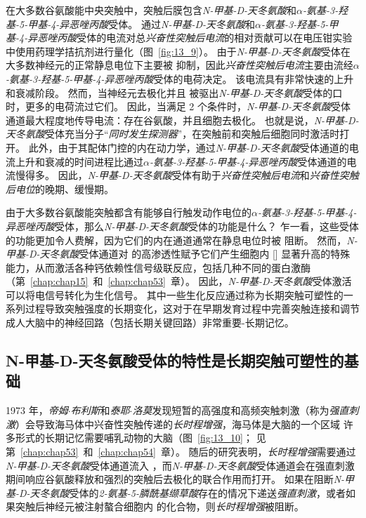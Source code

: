 在大多数谷氨酸能中央突触中，突触后膜包含\textit{N-甲基-D-天冬氨酸}和\textit{$\alpha$-氨基-3-羟基-5-甲基-4-异恶唑丙酸}受体。
通过\textit{N-甲基-D-天冬氨酸}和\textit{$\alpha$-氨基-3-羟基-5-甲基-4-异恶唑丙酸}受体的电流对总\textit{兴奋性突触后电流}的相对贡献可以在电压钳实验中使用药理学拮抗剂进行量化（图~\ref{fig:13_9}）。
由于\textit{N-甲基-D-天冬氨酸}受体在大多数神经元的正常静息电位下主要被  抑制，因此\textit{兴奋性突触后电流}主要由流经\textit{$\alpha$-氨基-3-羟基-5-甲基-4-异恶唑丙酸}受体的电荷决定。
该电流具有非常快速的上升和衰减阶段。
然而，当神经元去极化并且  被驱出\textit{N-甲基-D-天冬氨酸}受体的口时，更多的电荷流过它们。
因此，当满足 2 个条件时，\textit{N-甲基-D-天冬氨酸}受体通道最大程度地传导电流：存在谷氨酸，并且细胞去极化。
也就是说，\textit{N-甲基-D-天冬氨酸}受体充当分子“\textit{同时发生探测器}”，在突触前和突触后细胞同时激活时打开。
此外，由于其配体门控的内在动力学，通过\textit{N-甲基-D-天冬氨酸}受体通道的电流上升和衰减的时间进程比通过\textit{$\alpha$-氨基-3-羟基-5-甲基-4-异恶唑丙酸}受体通道的电流慢得多。
因此，\textit{N-甲基-D-天冬氨酸}受体有助于\textit{兴奋性突触后电流}和\textit{兴奋性突触后电位}的晚期、缓慢期。


由于大多数谷氨酸能突触都含有能够自行触发动作电位的\textit{$\alpha$-氨基-3-羟基-5-甲基-4-异恶唑丙酸}受体，那么\textit{N-甲基-D-天冬氨酸}受体的功能是什么？
乍一看，这些受体的功能更加令人费解，因为它们的内在通道通常在静息电位时被  阻断。
然而，\textit{N-甲基-D-天冬氨酸}受体通道对  的高渗透性赋予它们产生细胞内 [] 显著升高的特殊能力，从而激活各种钙依赖性信号级联反应，包括几种不同的蛋白激酶（第~\ref{chap:chap15}~和~\ref{chap:chap53}~章）。
因此，\textit{N-甲基-D-天冬氨酸}受体激活可以将电信号转化为生化信号。
其中一些生化反应通过称为长期突触可塑性的一系列过程导致突触强度的长期变化，这对于在早期发育过程中完善突触连接和调节成人大脑中的神经回路（包括长期关键回路）非常重要-长期记忆。



\subsection{N-甲基-D-天冬氨酸受体的特性是长期突触可塑性的基础}

1973 年，\textit{帝姆$\cdot$布利斯}和\textit{泰耶$\cdot$洛莫}发现短暂的高强度和高频突触刺激（称为\textit{强直刺激}）会导致海马体中兴奋性突触传递的\textit{长时程增强}，海马体是大脑的一个区域 许多形式的长期记忆需要哺乳动物的大脑（图~\ref{fig:13_10}；
见第~\ref{chap:chap53}~和~\ref{chap:chap54}~章）。
随后的研究表明，\textit{长时程增强}需要通过\textit{N-甲基-D-天冬氨酸}受体通道流入 ，而\textit{N-甲基-D-天冬氨酸}受体通道会在强直刺激期间响应谷氨酸释放和强烈的突触后去极化的联合作用而打开。
如果在阻断\textit{N-甲基-D-天冬氨酸}受体的\textit{2-氨基-5-膦酰基缬草酸}存在的情况下递送\textit{强直刺激}，或者如果突触后神经元被注射螯合细胞内  的化合物，则\textit{长时程增强}被阻断。


